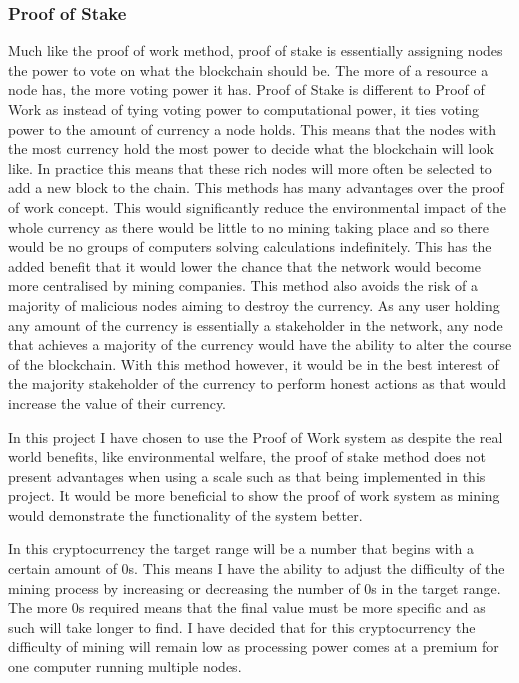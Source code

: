 \documentclass{l4proj}
\begin{document}
\subsubsection{Proof of Stake}
Much like the proof of work method, proof of stake is essentially assigning nodes the power to vote on what the
blockchain should be. The more of a resource a node has, the more voting power it has. Proof of Stake is different
to Proof of Work as instead of tying voting power to computational power, it ties voting power to the amount
of currency a node holds. This means that the nodes with the most currency hold the most power to decide what the
blockchain will look like. In practice this means that these rich nodes will more often be selected to add a new
block to the chain. This methods has many advantages over the proof of work concept. This would significantly
reduce the environmental impact of the whole currency as there would be little to no mining taking place and so
there would be no groups of computers solving calculations indefinitely. This has the added benefit that
it would lower the chance that the network would become more centralised by mining companies. This method also
avoids the risk of a majority of malicious nodes aiming to destroy the currency. As any user holding any amount
of the currency is essentially a stakeholder in the network, any node that achieves a majority of the currency 
would have the ability to alter the course of the blockchain. With this method however, it would be in the best
interest of the majority stakeholder of the currency to perform honest actions as that would increase the value
of their currency.

In this project I have chosen to use the Proof of Work system as despite the real world benefits, like environmental
welfare, the proof of stake method does not present advantages when using a scale such as that being implemented
in this project. It would be more beneficial to show the proof of work system as mining would demonstrate the
functionality of the system better.

In this cryptocurrency the target range will be a number that begins with a certain
amount of 0s. This means I have the ability to adjust the difficulty of the mining process by increasing
or decreasing the number of 0s in the target range. The more 0s required means that the final value must be more
specific and as such will take longer to find. I have decided that for this cryptocurrency the difficulty of mining
will remain low as processing power comes at a premium for one computer running multiple nodes.
\end{document}
